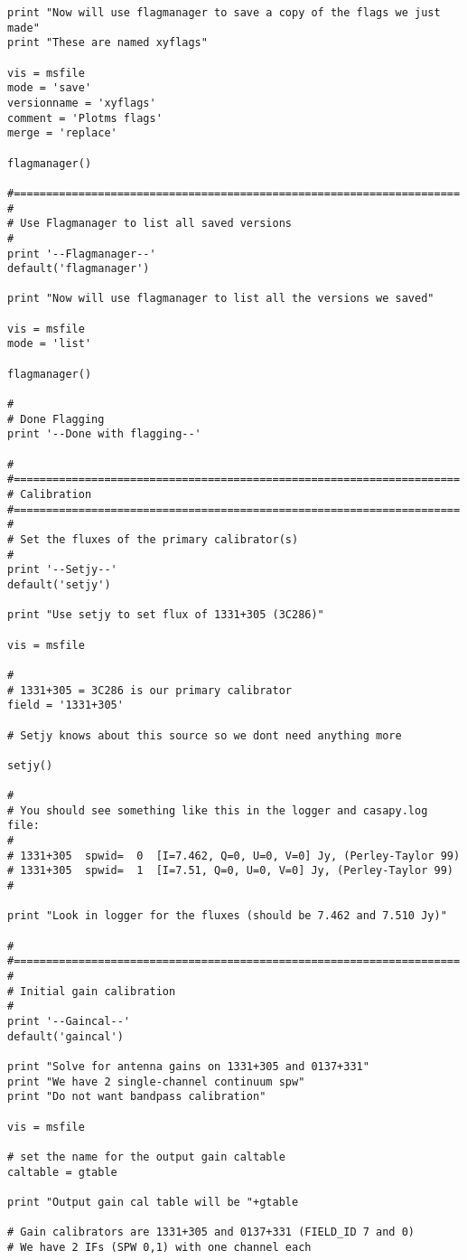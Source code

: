 \begin{verbatim}
print "Now will use flagmanager to save a copy of the flags we just made"
print "These are named xyflags"

vis = msfile
mode = 'save'
versionname = 'xyflags'
comment = 'Plotms flags'
merge = 'replace'

flagmanager()

#=====================================================================
#
# Use Flagmanager to list all saved versions
#
print '--Flagmanager--'
default('flagmanager')

print "Now will use flagmanager to list all the versions we saved"

vis = msfile
mode = 'list'

flagmanager()

#
# Done Flagging
print '--Done with flagging--'

#
#=====================================================================
# Calibration
#=====================================================================
#
# Set the fluxes of the primary calibrator(s)
#
print '--Setjy--'
default('setjy')

print "Use setjy to set flux of 1331+305 (3C286)"

vis = msfile

#
# 1331+305 = 3C286 is our primary calibrator
field = '1331+305'     

# Setjy knows about this source so we dont need anything more

setjy()

#
# You should see something like this in the logger and casapy.log file:
#
# 1331+305  spwid=  0  [I=7.462, Q=0, U=0, V=0] Jy, (Perley-Taylor 99)
# 1331+305  spwid=  1  [I=7.51, Q=0, U=0, V=0] Jy, (Perley-Taylor 99)
# 

print "Look in logger for the fluxes (should be 7.462 and 7.510 Jy)"

#
#=====================================================================
#
# Initial gain calibration
#
print '--Gaincal--'
default('gaincal')

print "Solve for antenna gains on 1331+305 and 0137+331"
print "We have 2 single-channel continuum spw"
print "Do not want bandpass calibration"

vis = msfile

# set the name for the output gain caltable
caltable = gtable

print "Output gain cal table will be "+gtable

# Gain calibrators are 1331+305 and 0137+331 (FIELD_ID 7 and 0)
# We have 2 IFs (SPW 0,1) with one channel each


\end{verbatim}
